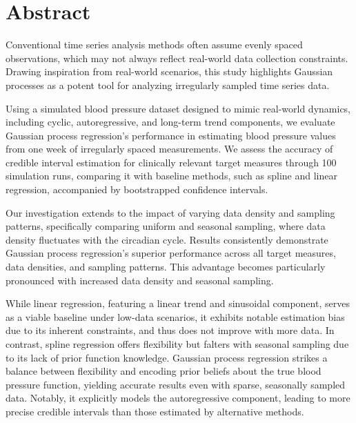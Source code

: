 \chapter*{Abstract}
Conventional time series analysis methods often assume evenly spaced observations,
which may not always reflect real-world data collection constraints.
Drawing inspiration from real-world scenarios, this study highlights Gaussian
processes as a potent tool for analyzing irregularly sampled
time series data.

Using a simulated blood pressure dataset designed to mimic real-world dynamics,
including cyclic, autoregressive, and long-term trend components,
we evaluate Gaussian process regression's performance in estimating
blood pressure values from one week of irregularly spaced measurements.
We assess the accuracy of credible interval estimation for clinically relevant
target measures through 100 simulation runs, comparing it with baseline methods,
such as spline and linear regression, accompanied by bootstrapped confidence intervals.

Our investigation extends to the impact of varying data density and sampling patterns,
specifically comparing uniform and seasonal sampling, where data density fluctuates with the circadian cycle.
Results consistently demonstrate Gaussian process regression's superior performance across all target measures,
data densities, and sampling patterns.
This advantage becomes particularly pronounced with increased data density and seasonal sampling.

While linear regression, featuring a linear trend and sinusoidal component,
serves as a viable baseline under low-data scenarios, it exhibits notable
estimation bias due to its inherent constraints, and thus does not improve with more data.
In contrast, spline regression offers flexibility but falters with seasonal
sampling due to its lack of prior function knowledge.
Gaussian process regression strikes a balance between flexibility and encoding
prior beliefs about the true blood pressure function, yielding accurate results
even with sparse, seasonally sampled data.
Notably, it explicitly models the autoregressive component,
leading to more precise credible intervals than those estimated by alternative methods.



